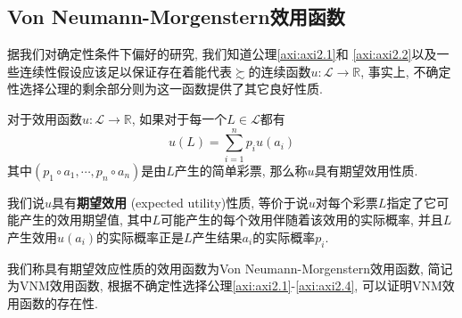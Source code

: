 \documentclass[cn, 12pt, math=mtpro2, bibstyle=apa, blue]{elegantbook}
\newcommand{\R}{\mathbb{R}}
\begin{document}
\subsection{Von Neumann-Morgenstern效用函数}
据我们对确定性条件下偏好的研究, 我们知道公理\ref{axi:axi2.1}和 \ref{axi:axi2.2}以及一些连续性假设应该足以保证存在着能代表$\succsim$的连续函数$u:\mathscr{L}\to\R$, 事实上, 不确定性选择公理的剩余部分则为这一函数提供了其它良好性质.
\begin{definition}
对于效用函数$u:\mathscr{L}\to\R$, 如果对于每一个$L\in\mathscr{L}$都有
$$u(L)=\sum_{i=1}^{n}p_iu(a_i)$$
其中$(p_1\circ a_1,\cdots,p_n\circ a_n)$是由$L$产生的简单彩票, 那么称$u$具有期望效用性质.
\end{definition}
我们说$u$具有\textbf{期望效用} (expected utility)性质, 等价于说$u$对每个彩票$L$指定了它可能产生的效用期望值, 其中$L$可能产生的每个效用伴随着该效用的实际概率, 并且$L$产生效用$u(a_i)$的实际概率正是$L$产生结果$a_i$的实际概率$p_i$.

我们称具有期望效应性质的效用函数为Von Neumann-Morgenstern效用函数, 简记为VNM效用函数, 根据不确定性选择公理\ref{axi:axi2.1}-\ref{axi:axi2.4}, 可以证明VNM效用函数的存在性.
\end{document}
